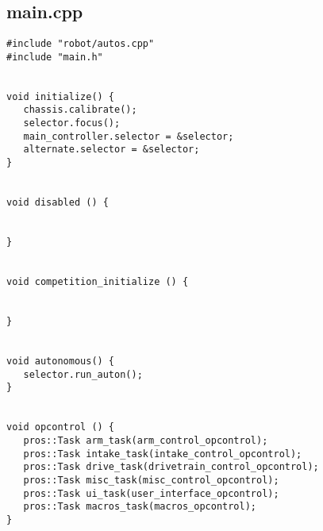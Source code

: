 \subsection*{main.cpp}
\begin{verbatim}
#include "robot/autos.cpp"
#include "main.h"


void initialize() {
   chassis.calibrate();
   selector.focus();
   main_controller.selector = &selector;
   alternate.selector = &selector;
}


void disabled () {


}


void competition_initialize () {


}


void autonomous() {
   selector.run_auton();
}


void opcontrol () {
   pros::Task arm_task(arm_control_opcontrol);
   pros::Task intake_task(intake_control_opcontrol);
   pros::Task drive_task(drivetrain_control_opcontrol);
   pros::Task misc_task(misc_control_opcontrol);
   pros::Task ui_task(user_interface_opcontrol);
   pros::Task macros_task(macros_opcontrol);
}


\end{verbatim}
